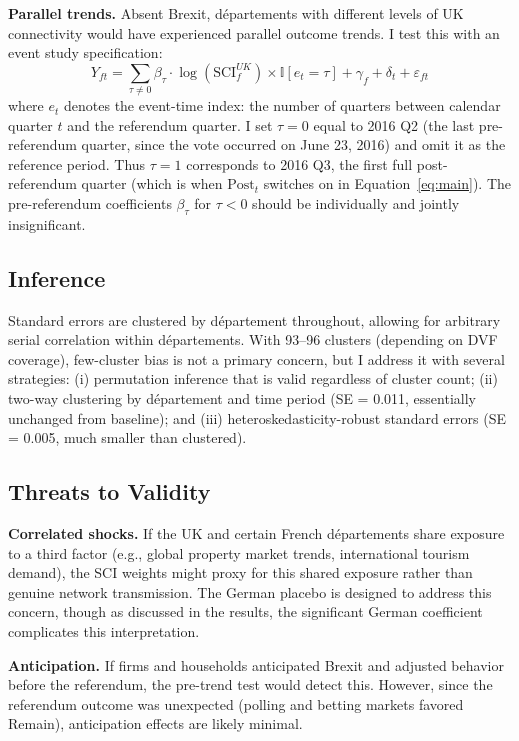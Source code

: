 \documentclass[12pt]{article}
\newcommand{\ind}{\mathbb{I}}
\begin{document}
\textbf{Parallel trends.} Absent Brexit, d\'epartements with different levels of UK connectivity would have experienced parallel outcome trends. I test this with an event study specification:
\begin{equation}
Y_{ft} = \sum_{\tau \neq 0} \beta_\tau \cdot \log(\text{SCI}_f^{UK}) \times \ind[e_t = \tau] + \gamma_f + \delta_t + \varepsilon_{ft}
\label{eq:event_study}
\end{equation}
where $e_t$ denotes the event-time index: the number of quarters between calendar quarter $t$ and the referendum quarter. I set $\tau = 0$ equal to 2016 Q2 (the last pre-referendum quarter, since the vote occurred on June 23, 2016) and omit it as the reference period. Thus $\tau = 1$ corresponds to 2016 Q3, the first full post-referendum quarter (which is when $\text{Post}_t$ switches on in Equation~\ref{eq:main}). The pre-referendum coefficients $\beta_\tau$ for $\tau < 0$ should be individually and jointly insignificant.

\subsection{Inference}

Standard errors are clustered by d\'epartement throughout, allowing for arbitrary serial correlation within d\'epartements. With 93--96 clusters (depending on DVF coverage), few-cluster bias is not a primary concern, but I address it with several strategies: (i) permutation inference that is valid regardless of cluster count; (ii) two-way clustering by d\'epartement and time period (SE = 0.011, essentially unchanged from baseline); and (iii) heteroskedasticity-robust standard errors (SE = 0.005, much smaller than clustered).

\subsection{Threats to Validity}

\textbf{Correlated shocks.} If the UK and certain French d\'epartements share exposure to a third factor (e.g., global property market trends, international tourism demand), the SCI weights might proxy for this shared exposure rather than genuine network transmission. The German placebo is designed to address this concern, though as discussed in the results, the significant German coefficient complicates this interpretation.

\textbf{Anticipation.} If firms and households anticipated Brexit and adjusted behavior before the referendum, the pre-trend test would detect this. However, since the referendum outcome was unexpected (polling and betting markets favored Remain), anticipation effects are likely minimal.
\end{document}
